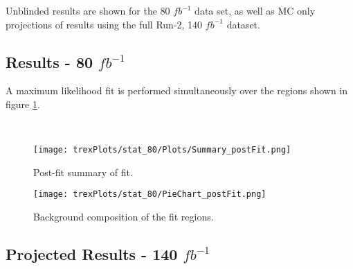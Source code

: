 Unblinded results are shown for the 80 $fb^{-1}$ data set, as well as MC only projections of results using the full Run-2, 140 $fb^{-1}$ dataset.

\subsection{Results - 80 $fb^{-1}$}
\label{sec:res80}

A maximum likelihood fit is performed simultaneously over the regions shown in figure \ref{fig:sigRegions80}.

\begin{figure}[h!]
    \\
    \caption{}
    \label{fig:sigRegions80}
\end{figure}

\begin{figure}[h!]
    \center
    \texttt{[image: trexPlots/stat\_80/Plots/Summary\_postFit.png]}
    \caption{Post-fit summary of fit.}                                                                          
    \label{fig:Summary80}
\end{figure}

\begin{figure}[H]
    \centering
    \texttt{[image: trexPlots/stat\_80/PieChart\_postFit.png]}
    \caption{Background composition of the fit regions.}
    \label{fig:pieChart80}
\end{figure} 


\subsection{Projected Results - 140 $fb^{-1}$}   
\label{sec:res140}

\begin{figure}[h!]
    \\
    \caption{}
    \label{fig:sigRegions140}
\end{figure}

